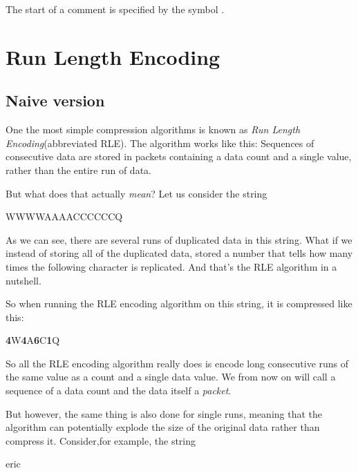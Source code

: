 \begin{refsection}
The start of a comment is specified by the symbol \commentsymbol.

\section{Run Length Encoding}
\label{sec:rle}

\subsection{Naive version}
\label{sec:most-simple-version}

One the most simple compression algorithms is known as \textit{Run
  Length Encoding}(abbreviated
RLE)\cite{nagarajan11:_enhan_approac_run_lengt_encod_schem}.
The algorithm works like this: Sequences of consecutive data are stored
in packets containing a data count and a single value, rather than the
entire run of data.

But what does that actually \textit{mean}? Let us consider the string

\begin{indentpar}
  WWWWAAAACCCCCCQ
\end{indentpar}

As we can see, there are several runs of duplicated data in this
string. What if we instead of storing all of the duplicated data,
stored a number that tells how many times the following character
is replicated. And that's the RLE algorithm in a nutshell.

So when running the RLE encoding algorithm on this string, it is
compressed like this:

\newcommand{\pkt}[2]{\textbf{#1}#2}

\begin{indentpar}
  \pkt{4}{W}\pkt{4}{A}\pkt{6}{C}\pkt{1}{Q}
\end{indentpar}

So all the RLE encoding algorithm really does is encode long
consecutive runs of the same value as a count and a single data
value. We from now on will call a sequence of a data count and the
data itself a \textit{packet}.

But however, the same thing is also done for single runs, meaning that
the algorithm can potentially explode the size of the original data
rather than compress it. Consider,for example, the string

\begin{indentpar}
  eric
\end{indentpar}


\end{refsection}
